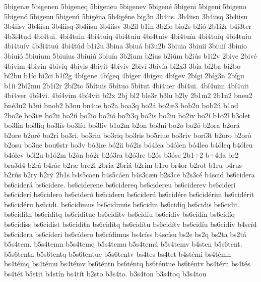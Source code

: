 {5bigen^^e6
5bigenen
5bigeneq
5bigeneu
5bigenev
5bigen^^e9
5bigeni
5bigen^^ed
5bigeno
5bigen^^f3
5bigenu
5bigen^^fa
5big^^e9na
5b4ig^^e9ne
big3n
3b4iis.
3b4iisn
3b4iisq
3b4iisu
3b4iisv
3b4i^^edsn
3b4i^^edsq
3b4i^^edsu
3b4i^^edsv
3b2il
b1in
3b2io
bio2s
b2i^^f3
2b1i2r
b4i3ter
4b3i4tud
4bi4tui.
4bi4tuin
4bi4tuiq
4bi4tuiu
4bi4tuiv
4bi4tu^^edn
4bi4tu^^edq
4bi4tu^^edu
4bi4tu^^edv
4b3i4tu^^fa
4bi4t^^fad
b1i2u
3biua
3biu^^e1
bi3u2b
3biuia
3biuii
3biui^^ed
3biuio
3biui^^f3
5biuium
5biuius
3biui^^fa
3biu^^eda
3b2ium
b2ius
b2i^^fam
b2i^^fas
b1i2v
2bive
2biv^^e9
4bivim
4bivin
4biviq
4bivis
4bivit
4biviv
2biv^^ed
3biv^^eda
bi2x3
3b^^eda
b^^ed2ba
b^^ed2bo
b^^ed2bu
b1^^edc
b^^ed2ci
b1^^ed2g
4b^^edgene
4b^^edgeq
4b^^edger
4b^^edgeu
4b^^edgev
2b^^edgi
2b^^edg3n
2b^^edgu
b1^^edi
2b^^ed2mu
2b1^^ed2r
2b^^ed2to
5b^^edtuis
5b^^edtuo
5b^^edtut
4b^^ed4uer
4b^^ed4ui.
4b^^ed4uim
4b^^ed4uit
4b^^ed4ver
4b^^ed4vi.
4b^^ed4vim
4b^^ed4vit
b^^ed2x
2bj
bl2
ble3r
b3lu
b2ly
2b1m2
2b1n2
bneu2
bn^^e93u2
b3ni
bnob2
b3nu
bn4ue
bo2a
boa3q
bo2^^e1
bo2^^e63
bob2u
bob2^^fa
b1od
2bo2e
bo3i^^e6
bo2ii
bo2i^^ed
bo2io
bo2i^^f3
bo2i3q
bo2is
bo2iu
bo2iv
bo2^^ed
b1o2l
b3olet
bo3l^^edn
bo3l^^edq
bo3l^^eds
bo3l^^edu
bo3l^^edv
b1o2m
b2on
bo3ni
bo2o
bo2^^f3
b2ora
b2or^^e1
b2ore
b2or^^e9
bo2ri
bo3ri.
bo3rin
bo3riq
bo3ris
bo5riue
bo3riv
bor^^ed3t
b2oro
b2or^^f3
b2osu
bo3ue
bou6str
bo3v
b^^f33i^^e6
b^^f32ii
b^^f32is
b^^f34lea
b4^^f3len
b^^f34leo
b4^^f3leq
b4^^f3leu
b4^^f3lev
b^^f3l2u
b1^^f32m
b2^^f3n
b^^f32r
b2^^f33ra
b2^^f33re
b2^^f3s
b3^^f3sc
2b1^^f72
b^^f74da
br2
bra3d4
b2r^^e1
b4r^^e1c
b2r^^e6
bre2i
2bria
2bri^^e1
b2rim
b1ro
br4or
b2rot
b1ru
b4rus
b2r^^fas
b2ry
b2r^^fd
2b1s
b4s5caen
b4s5c^^e1en
b4s3c^^e6n
b2s3ce
b2s3c^^e9
b4scid
bs6cidera
bs6cider^^e1
bs6cidere.
bs6ciderene
bs6cidereq
bs6cidereu
bs6ciderev
bs6cideri
bs6cider^^ed
bs6cidero
bs6cider^^f3
bs6cideru
bs6cider^^fa
bs6cid^^e9re
bs6cid^^e9rim
bs6cid^^e9rit
bs6cid^^e9ru
bs6cidi.
bs6cidimus
bs6cidim^^fas
bs6cidin
bs6cidiq
bs6cidis
bs6cidit.
bs6ciditn
bs6ciditq
bs6ciditue
bs6ciditv
bs6cidiu
bs6cidiv
bs6cid^^edn
bs6cid^^edq
bs6cid^^edss
bs6cid^^edst
bs6cid^^edtn
bs6cid^^edtq
bs6cid^^edtu
bs6cid^^edtv
bs6cid^^edu
bs6cid^^edv
b4sc^^edd
bs6c^^eddera
bs6c^^edderi
bs6c^^eddero
bs6c^^eddimus
bs4c^^edss
b4sc^^edsu
bs2e
bs2q
bs2ta
bs2t^^e1
b5s4tem.
b5s4temn
b5s4temq
b5s4temu
b5s4tem^^fa
b5s4temv
b4sten
b5s6tent.
b5s6tentn
b5s6tentq
b5s6tentue
b5s6tentv
bs4tes
bs4tet
b4st^^e9mi
bs4t^^e9mn
bs4t^^e9mq
bs4t^^e9mu
bs4t^^e9mv
bs6t^^e9ntn
bs6t^^e9ntq
bs6t^^e9ntue
bs6t^^e9ntv
bs4t^^e9rn
bs4t^^e9s
bs4t^^e9t
b5stit
b4st^^edn
bs4t^^edt
b2sto
b3s4to.
b3s4ton
b3s4toq
b3s4tou
}
